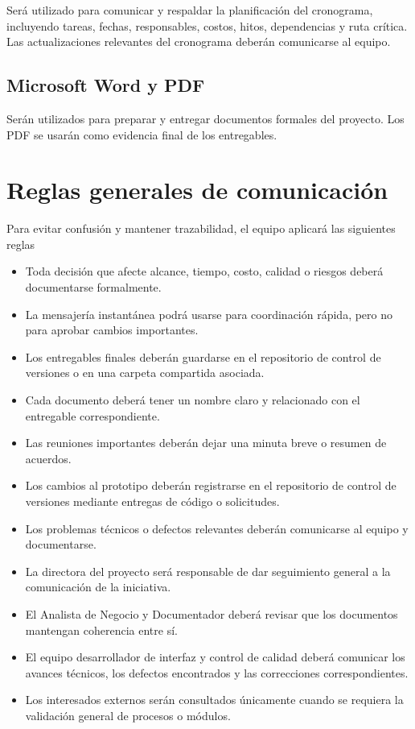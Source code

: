 \documentclass[11pt,spanish]{article}
\begin{document}
Será utilizado para comunicar y respaldar la planificación del cronograma, incluyendo tareas, fechas, responsables, costos, hitos, dependencias y ruta crítica. Las actualizaciones relevantes del cronograma deberán comunicarse al equipo.

\subsection{Microsoft Word y PDF}

Serán utilizados para preparar y entregar documentos formales del proyecto. Los PDF se usarán como evidencia final de los entregables.

\section{Reglas generales de comunicación}

Para evitar confusión y mantener trazabilidad, el equipo aplicará las siguientes reglas

\begin{itemize}
    \item Toda decisión que afecte alcance, tiempo, costo, calidad o riesgos deberá documentarse formalmente.
    \item La mensajería instantánea podrá usarse para coordinación rápida, pero no para aprobar cambios importantes.
    \item Los entregables finales deberán guardarse en el repositorio de control de versiones o en una carpeta compartida asociada.
    \item Cada documento deberá tener un nombre claro y relacionado con el entregable correspondiente.
    \item Las reuniones importantes deberán dejar una minuta breve o resumen de acuerdos.
    \item Los cambios al prototipo deberán registrarse en el repositorio de control de versiones mediante entregas de código o solicitudes.
    \item Los problemas técnicos o defectos relevantes deberán comunicarse al equipo y documentarse.
    \item La directora del proyecto será responsable de dar seguimiento general a la comunicación de la iniciativa.
    \item El Analista de Negocio y Documentador deberá revisar que los documentos mantengan coherencia entre sí.
    \item El equipo desarrollador de interfaz y control de calidad deberá comunicar los avances técnicos, los defectos encontrados y las correcciones correspondientes.
    \item Los interesados externos serán consultados únicamente cuando se requiera la validación general de procesos o módulos.
\end{itemize}
\end{document}
